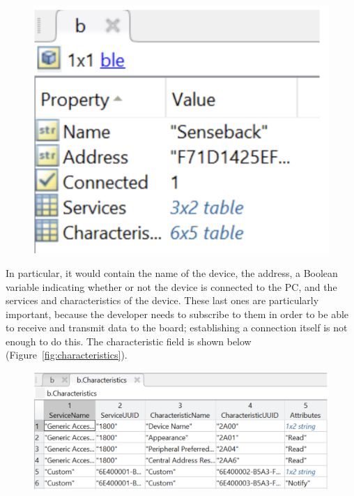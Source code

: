 \documentclass{Configuration_Files/PoliMi3i_thesis}
\begin{document}
\begin{figure}[H]
    \centering
    \includegraphics[scale=0.3]{Board Windows PC/4.png}
    \label{fig:nrf_connect_log}
\end{figure}

In particular, it would contain the name of the device, the address, a Boolean variable indicating whether or not the device is connected to the PC, and the services and characteristics of the device. These last ones are particularly important, because the developer needs to subscribe to them in order to be able to receive and transmit data to the board; establishing a connection itself is not enough to do this. The characteristic field is shown below (Figure~\ref{fig:characteristics}).

\begin{figure}[H]
    \centering
    \includegraphics[scale=0.3]{Board Windows PC/5.png}
    \label{fig:nrf_connect_log}
\end{figure}
\end{document}
